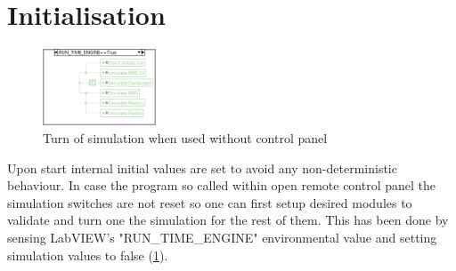 \section{Initialisation}
\begin{figure}
    \centering
    \includegraphics[width=0.3\textwidth]{figures/Run_maind31.png}
    \caption{Turn of simulation when used without control panel}
    \label{vi:maind31}
    \vspace{-15pt}
\end{figure}
Upon start internal initial values are set to avoid any non-deterministic behaviour. In case the program so called within open remote control panel the simulation switches are not reset so one can first setup desired modules to validate and turn one the simulation for the rest of them.
This has been done by sensing LabVIEW's "RUN\_TIME\_ENGINE" environmental value and setting simulation values to false (\ref{vi:maind31}).
\\ \\
